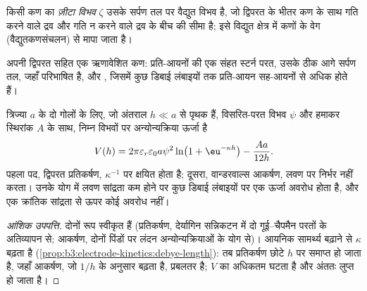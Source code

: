 \begin{definition}[ज़ीटा विभव]\label{def:b3:colloids:zeta}
किसी कण का \emph{ज़ीटा विभव} $\zeta$ उसके सर्पण तल पर वैद्युत
विभव है, जो द्विपरत के भीतर कण के साथ गति करने वाले द्रव और
गति न करने वाले द्रव के बीच की सीमा है; इसे विद्युत क्षेत्र में कणों के वेग
(वैद्युतकणसंचलन) से मापा जाता है।
\end{definition}

\begin{omfigure}

{\small अपनी द्विपरत सहित एक ऋणावेशित कण: प्रति-आयनों की एक संहत स्टर्न
परत, उसके ठीक आगे सर्पण तल, जहाँ  परिभाषित है, और , जिसमें कुछ डिबाई लंबाइयों तक प्रति-आयन
सह-आयनों से अधिक होते हैं।}
\end{omfigure}

\begin{theorem}[DLVO सिद्धांत]\label{thm:b3:colloids:dlvo}
त्रिज्या $a$ के दो गोलों के लिए, जो अंतराल $h \ll a$ से पृथक हैं, विसरित-परत विभव
$\psi$ और हमाकर स्थिरांक $A$ के साथ, निम्न विभवों पर अन्योन्यक्रिया ऊर्जा है
\[
  V(h) = 2\pi\varepsilon_r\varepsilon_0a\psi^2\ln\bigl(1 + \eu^{-\kappa h}\bigr) - \frac{Aa}{12h} .
\]
पहला पद, द्विपरत प्रतिकर्षण,  $\kappa^{-1}$ पर क्षयित होता है;
दूसरा, वान्डरवाल्स आकर्षण, लवण पर निर्भर नहीं करता। उनके योग में
लवण सांद्रता कम होने पर कुछ डिबाई लंबाइयों पर एक ऊर्जा अवरोध होता है,
और एक क्रांतिक सांद्रता से ऊपर कोई अवरोध नहीं।
\end{theorem}

\begin{proof}[आंशिक उपपत्ति]
दोनों रूप स्वीकृत हैं (प्रतिकर्षण, देर्यागिन सन्निकटन में दो गूई--चैपमैन
परतों के अतिव्यापन से; आकर्षण, दोनों पिंडों पर लंदन
अन्योन्यक्रियाओं के योग से)। आयनिक सामर्थ्य बढ़ाने से $\kappa$ बढ़ता है
(\cref{prop:b3:electrode-kinetics:debye-length}): तब प्रतिकर्षण
छोटे $h$ पर समाप्त हो जाता है, जहाँ आकर्षण, जो $1/h$ के अनुसार बढ़ता है, प्रबलतर है;
$V$ का अधिकतम घटता है और अंततः लुप्त हो जाता है।
\end{proof}

